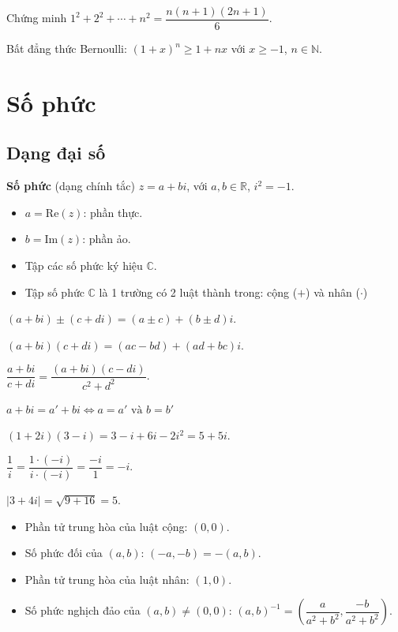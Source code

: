 \documentclass[12pt,a4paper]{article}
\begin{document}
\begin{vidu}
  Chứng minh $1^2 + 2^2 + \cdots + n^2 = \dfrac{n(n+1)(2n+1)}{6}$. 
  
  Bất đẳng thức Bernoulli: $(1+x)^n \ge 1 + nx$ với $x \ge -1$, $n \in \mathbb{N}$.
\end{vidu}

\section{Số phức}

\subsection{Dạng đại số}

\begin{dinhnghia}
  \textbf{Số phức} (dạng chính tắc) $z = a + bi$, với $a, b \in \mathbb{R}$, $i^2 = -1$.
  \begin{itemize}
    \item $a = \mathrm{Re}(z)$: phần thực.
    \item $b = \mathrm{Im}(z)$: phần ảo.
    \item Tập các số phức ký hiệu $\mathbb{C}$.
    \item Tập số phức $\mathbb{C}$ là 1 trường có 2 luật thành trong: cộng ($+$) và nhân ($\cdot$)
  \end{itemize}
\end{dinhnghia}

\begin{congthuc}[title={Các phép toán}]
  $(a+bi) \pm (c+di) = (a \pm c) + (b \pm d)i$.
  
  $(a+bi)(c+di) = (ac-bd) + (ad+bc)i$.
  
  $\dfrac{a+bi}{c+di} = \dfrac{(a+bi)(c-di)}{c^2+d^2}$.

  $a + bi = a' + bi \Leftrightarrow a = a' \text{ và } b = b'$
\end{congthuc}

\begin{vidu}
  $(1+2i)(3-i) = 3 - i + 6i - 2i^2 = 5 + 5i$.
  
  $\dfrac{1}{i} = \dfrac{1 \cdot (-i)}{i \cdot (-i)} = \dfrac{-i}{1} = -i$. 
  
  $|3+4i| = \sqrt{9+16} = 5$.
\end{vidu}

\begin{tinhchat}[title={$\mathbb{C}$ là trường}]
  \begin{itemize}
    \item Phần tử trung hòa của luật cộng: $(0, 0)$.
    \item Số phức đối của $(a, b)$: $(-a, -b) = -(a, b)$.
    \item Phần tử trung hòa của luật nhân: $(1, 0)$.
    \item Số phức nghịch đảo của $(a, b) \ne (0, 0)$: $(a, b)^{-1} = \left(\dfrac{a}{a^2 + b^2}, \dfrac{-b}{a^2 + b^2}\right)$.
  \end{itemize}
\end{tinhchat}
\end{document}
